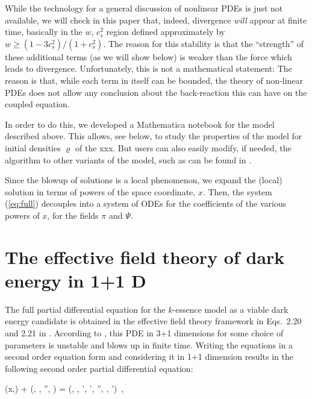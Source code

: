 \documentclass[12pt,a4paper]{article}
\let\rho=\varrho
\def\eref#1{(\ref{#1})}
\numberwithin{equation}{section}
\theoremstyle{definition} %
\def\citep#1{\cite{#1}}
\newcommand{\NN}{\mathcal {N}}
\newcommand{\LL}{\mathcal {L}}
\begin{document}
While the technology for a general discussion of nonlinear PDEs is
just not available, we will check in this paper that, indeed,
divergence \emph{will} appear at finite time, basically in the $w$,
$c_s^2$ region defined approximately by $w\ge (1-3c_s^2)/(1+c_s^2)$.
The reason for this stability is that the ``strength'' of these
additional terms (as we will show below) is weaker than the force
which leads to divergence. Unfortunately, this is not a mathematical
statement: The reason is that, while each term in itself can be
bounded, the theory of non-linear PDEs does not allow any conclusion
about the back-reaction this can have on the coupled equation.

In order to do this, we developed a Mathematica notebook for the model
described above. This allows, see below, to study the properties of the
model for initial densities $\rho$ of the xxx. But users can also
easily modify, if needed, the algorithm to other variants of the
model, such as can be found in \citep{xxx,xxx}.

Since the blowup of solutions is a local phenomenon, we expand the
(local) solution in terms of powers of the space coordinate,
$x$. Then, the system \eref{eq:full} decouples into a system of ODEs
for the coefficients of the various powers of $x$, for the fields
$\pi$ and $\Psi$.



\section{The effective field theory of dark energy in 1+1 D}
The full partial differential equation for the $k$-essence model as a
viable dark energy candidate is obtained in the effective field theory
framework in Eqs.~2.20 and 2.21 in \cite{Hassani:2019lmy}. According
to \cite{Hassani:2019lmy}, this PDE in 3+1 dimensions for some choice of
parameters is unstable and blows up in finite time. Writing the
equations in a second order equation form and considering it in 1+1
dimension results in the following second order partial differential
equation:
\begin{equa}
 \ddot{\pi}(x,\tau) +  \LL (\pi, \dot \pi, \pi'', \Psi)  =  \NN (\pi,  	\dot \pi,   \pi',    \dot \pi',  \pi'', \Psi, \Psi') \,, \label{full_equation}
\end{equa}
\end{document}
